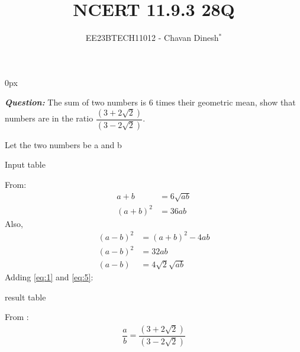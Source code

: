 \documentclass[journal,12pt,twocolumn]{IEEEtran}
\theoremstyle{remark}
\begin{document}
\parindent 0px

\vspace{3cm}

\title{NCERT 11.9.3 28Q}
\author{EE23BTECH11012 - Chavan Dinesh$^{*}$%
}
\maketitle
\newpage
\bigskip

\renewcommand{\thefigure}{\arabic{figure}}
\renewcommand{\thetable}{\arabic{table}}
\large\textbf{\textsl{Question:}}
The sum of two numbers is $6$ times their geometric mean, show that numbers are in the ratio $\dfrac{(3+2\sqrt{2})}{(3-2\sqrt{2})}$.

\solution
Let the two numbers be a and b
\begin{table}[htbp]
    \centering
    
    \caption{Input table}
    \label{tab:parameter_table.11.9.3.28}
\end{table}

From:
\begin{align}
    a + b &= 6 \sqrt{ab} \label{eq:1}\\
    (a + b)^2 &= 36ab\label{eq:2}
\end{align}
Also,
\begin{align}
    (a - b)^2 &= (a + b)^2 -4ab\\
     (a - b)^2  &= 32ab\\
     (a - b ) &= 4\sqrt{2}\sqrt{ab}\label{eq:5}
\end{align}
Adding \eqref{eq:1} and \eqref{eq:5}:
\begin{table}[htbp]
    \centering
    
    \caption{result table}
    \label{tab:table.11.9.3.28}
\end{table}

From :
\begin{align}
   \dfrac{a}{b} = \dfrac{(3+2\sqrt{2})}{(3-2\sqrt{2})}
\end{align}




\end{document}
